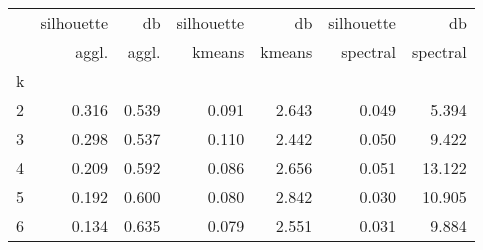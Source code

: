 \begin{tabular}{lrrrrrr}
\toprule
{} &    silhouette &            db & silhouette &     db & silhouette &       db \\
{} &    aggl. &              aggl. &     kmeans & kmeans &   spectral & spectral \\
k &               &               &            &        &            &          \\
\midrule
2 &         0.316 &         0.539 &      0.091 &  2.643 &      0.049 &    5.394 \\
3 &         0.298 &         0.537 &      0.110 &  2.442 &      0.050 &    9.422 \\
4 &         0.209 &         0.592 &      0.086 &  2.656 &      0.051 &   13.122 \\
5 &         0.192 &         0.600 &      0.080 &  2.842 &      0.030 &   10.905 \\
6 &         0.134 &         0.635 &      0.079 &  2.551 &      0.031 &    9.884 \\
\bottomrule
\end{tabular}

